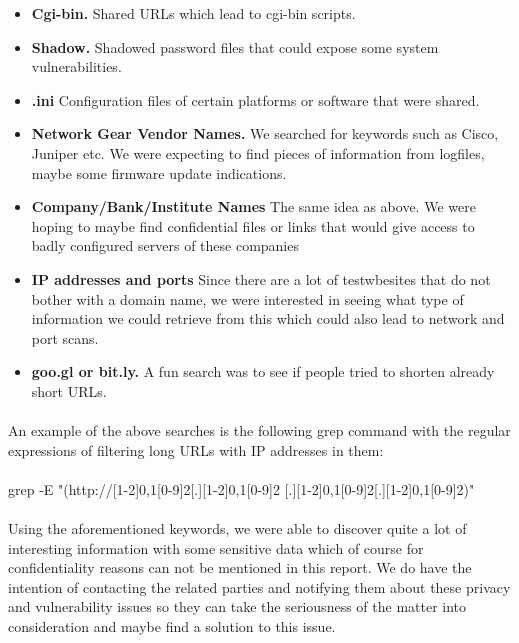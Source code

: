 \documentclass[12pt]{article}
\begin{document}
\begin{itemize}
\item \textbf{Cgi-bin.} Shared URLs which lead to cgi-bin scripts.

\item \textbf{Shadow.} Shadowed password files that could expose some system vulnerabilities.

\item \textbf{.ini} Configuration files of certain platforms or software that were shared.

\item \textbf{Network Gear Vendor Names.} We searched for keywords such as Cisco, Juniper etc. We were expecting to find pieces of information from logfiles, maybe some firmware update indications.

\item \textbf{Company/Bank/Institute Names} The same idea as above. We were hoping to maybe find confidential files or links that would give access to badly configured servers of these companies

\item \textbf{IP addresses and ports} Since there are a lot of testwbesites that do not bother with a domain name, we were interested in seeing what type of information we could retrieve from this which could also lead to network and port scans.

\item \textbf{goo.gl or bit.ly.} A fun search was to see if people tried to shorten already short URLs.

\end{itemize}

\paragraph{}
An example of the above searches is the following grep command with the regular expressions of filtering long URLs with IP addresses in them:

\paragraph{}
grep -E "(http://[1-2]{0,1}[0-9]{2}[.][1-2]{0,1}[0-9]{2}
[.][1-2]{0,1}[0-9]{2}[.][1-2]{0,1}[0-9]{2})"

\paragraph{}
Using the aforementioned keywords, we were able to discover quite a lot of interesting information with some sensitive data which of course for confidentiality reasons can not be mentioned in this report. We do have the intention of contacting the related parties and notifying them about these privacy and vulnerability issues so they can take the seriousness of the matter into consideration and maybe find a solution to this issue.
\end{document}

